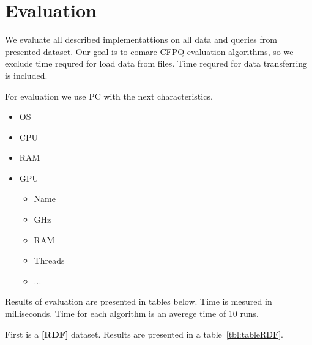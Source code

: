 \section{Evaluation}

We evaluate all described implementattions on all data and queries from presented dataset.
Our goal is to comare CFPQ evaluation algorithms, so we exclude time requred for load data from files.
Time requred for data transferring is included.

For evaluation we use PC with the next characteristics.
\begin{itemize}
  \item OS
  \item CPU
  \item RAM
  \item GPU
   \begin{itemize}
    \item Name
    \item GHz
    \item RAM
    \item Threads
    \item ...
   \end{itemize}
\end{itemize}


Results of evaluation are presented in tables below.
Time is mesured in milliseconds.
Time for each algorithm is an averege time of 10 runs.

First is a \textbf{[RDF]} dataset.
Results are presented in a table~\ref{tbl:tableRDF}.

